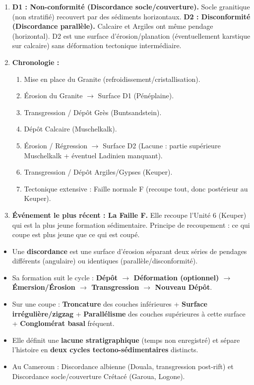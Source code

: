 \documentclass[11pt]{article}
\begin{document}
\begin{corrige}
\begin{enumerate}
    \item \textbf{D1 : Non-conformité (Discordance socle/couverture).} Socle granitique (non stratifié) recouvert par des sédiments horizontaux. \textbf{D2 : Disconformité (Discordance parallèle).} Calcaire et Argiles ont même pendage (horizontal). D2 est une surface d'érosion/planation (éventuellement karstique sur calcaire) sans déformation tectonique intermédiaire.
    \item \textbf{Chronologie :}
    \begin{enumerate}
        \item Mise en place du Granite (refroidissement/cristallisation).
        \item Érosion du Granite $\rightarrow$ Surface D1 (Pénéplaine).
        \item Transgression / Dépôt Grès (Buntsandstein).
        \item Dépôt Calcaire (Muschelkalk).
        \item Érosion / Régression $\rightarrow$ Surface D2 (Lacune : partie supérieure Muschelkalk + éventuel Ladinien manquant).
        \item Transgression / Dépôt Argiles/Gypses (Keuper).
        \item Tectonique extensive : Faille normale F (recoupe tout, donc postérieur au Keuper).
    \end{enumerate}
    \item \textbf{Événement le plus récent : La Faille F.} Elle recoupe l'Unité 6 (Keuper) qui est la plus jeune formation sédimentaire. Principe de recoupement : ce qui coupe est plus jeune que ce qui est coupé.
\end{enumerate}
\end{corrige}

\begin{aretenir}
\begin{itemize}
    \item Une \textbf{discordance} est une surface d'érosion séparant deux séries de pendages différents (angulaire) ou identiques (parallèle/disconformité).
    \item Sa formation suit le cycle : \textbf{Dépôt $\rightarrow$ Déformation (optionnel) $\rightarrow$ Émersion/Érosion $\rightarrow$ Transgression $\rightarrow$ Nouveau Dépôt}.
    \item Sur une coupe : \textbf{Troncature} des couches inférieures + \textbf{Surface irrégulière/zigzag} + \textbf{Parallélisme} des couches supérieures à cette surface + \textbf{Conglomérat basal} fréquent.
    \item Elle définit une \textbf{lacune stratigraphique} (temps non enregistré) et sépare l'histoire en \textbf{deux cycles tectono-sédimentaires} distincts.
    \item Au Cameroun : Discordance albienne (Douala, transgression post-rift) et Discordance socle/couverture Crétacé (Garoua, Logone).
\end{itemize}
\end{aretenir}
\end{document}
